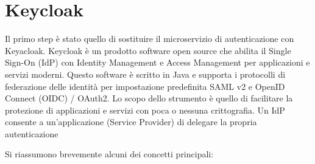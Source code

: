 \documentclass{article}
\begin{document}
\section{Keycloak}


Il primo step è stato quello di sostituire il microservizio di autenticazione con Keyacloak. Keycloak è un
prodotto software open source che abilita il Single Sign-On (IdP) con Identity Management e
Access Management per applicazioni e servizi moderni. Questo software è scritto in Java e
supporta i protocolli di federazione delle identità per impostazione predefinita SAML v2 e
OpenID Connect (OIDC) / OAuth2. Lo scopo dello strumento è quello di facilitare la protezione
di applicazioni e servizi con poca o nessuna crittografia. Un IdP consente a un'applicazione
(Service Provider) di delegare la propria autenticazione %

Si riassumono brevemente alcuni dei concetti principali:
\end{document}
